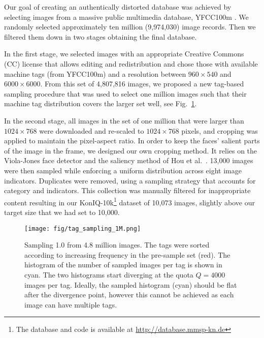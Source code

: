 \documentclass[10pt,journal,compsoc]{IEEEtran}
\begin{document}
Our goal of creating an authentically distorted database was achieved by selecting images from a massive public multimedia database, YFCC\-100m \cite{thomee:2016}. We randomly selected approximately ten million (9,974,030) image records. Then we filtered them down in two stages obtaining the final database.

In the first stage, we selected images with an appropriate Creative Commons (CC) license that allows editing and redistribution and chose those with available machine tags (from YFCC100m) and a resolution between $960\times540$ and $6000\times6000$. From this set of 4,807,816 images, we proposed a new tag-based sampling procedure that was used to select one million images such that their machine tag distribution covers the larger set well, see Fig.~\ref{fig:tag_sampling}.

In the second stage, all images in the set of one million that were larger than  $1024\times768$ were downloaded and re-scaled to $1024\times768$ pixels, and cropping was applied to maintain the pixel-aspect ratio. In order to keep the faces' salient parts of the image in the frame, we designed our own cropping method. It relies on the Viola-Jones face detector and the saliency method of Hou et al.\ \cite{hou_image_2012}. 13,000 images were then sampled while enforcing a uniform distribution across eight image indicators. Duplicates were removed, using a sampling strategy that accounts for category and indicators. This collection was manually filtered for inappropriate content resulting in our KonIQ-10k\footnote{The database and code is available at \url{http://database.mmsp-kn.de}} dataset of 10,073 images, slightly above our target size that we had set to 10,000.

\begin{figure}[!t]
\centering
\vspace{-10pt}
\texttt{[image: fig/tag\_sampling\_1M.png]}
\caption{Sampling 1.0 from 4.8 million images. The tags were sorted according to increasing frequency in the pre-sample set (red). The histogram of the number of sampled images per tag is shown in cyan. The two histograms start diverging at the quota $Q=4000$ images per tag. Ideally, the sampled histogram (cyan) should be flat after the divergence point, however this cannot be achieved as each image can have multiple tags.\vspace{-5pt}}
\label{fig:tag_sampling}
\vspace{-5pt}
\end{figure}
\end{document}
